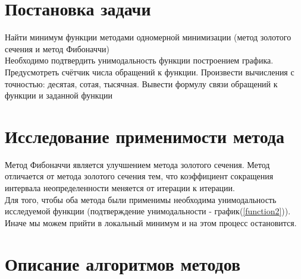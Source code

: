 \documentclass[main.tex]{subfiles}
\begin{document}
	
	\section{Постановка задачи}
	Найти минимум функции методами одномерной минимизации (метод золотого сечения и метод Фибоначчи)\\
	Необходимо подтвердить унимодальность функции построением графика.\\
	Предусмотреть счётчик числа обращений к функции.
	Произвести вычисления с точностью: десятая, сотая, тысячная.
	Вывести формулу связи обращений к функции и заданной функции
	\section{Исследование применимости метода}
	Метод Фибоначчи является улучшением метода золотого сечения. Метод отличается от метода золотого сечения тем, что коэффициент сокращения интервала неопределенности меняется от итерации к итерации.\\
	Для того, чтобы оба метода были применимы необходима унимодальность исследуемой функции (подтверждение унимодальности - график(\ref{function2})). Иначе мы можем прийти в локальный минимум и на этом процесс остановится.
	\newpage
	\section{Описание алгоритмов методов}
\end{document}
